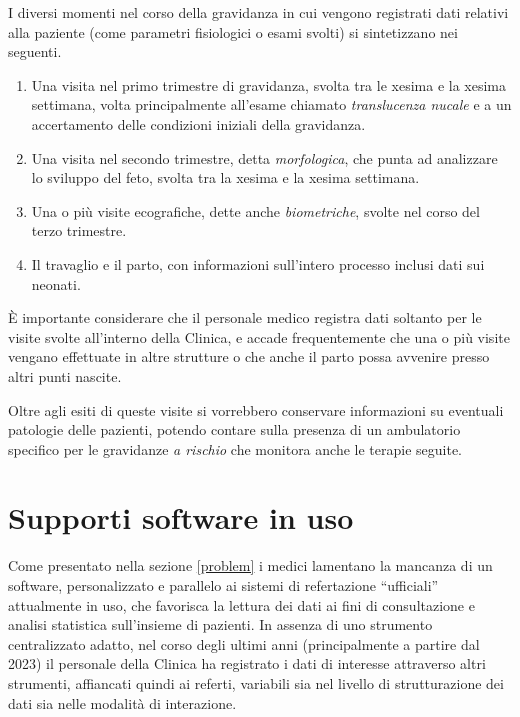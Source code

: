 I diversi momenti nel corso della gravidanza in cui vengono registrati dati relativi alla paziente (come parametri fisiologici o esami svolti) si sintetizzano nei seguenti.

\begin{enumerate}
\item Una visita nel primo trimestre di gravidanza, svolta tra le xesima e la xesima settimana, volta principalmente all'esame chiamato \emph{translucenza nucale} e a un accertamento delle condizioni iniziali della gravidanza.
\item Una visita nel secondo trimestre, detta \emph{morfologica}, che punta ad analizzare lo sviluppo del feto, svolta tra la xesima e la xesima settimana.
\item Una o più visite ecografiche, dette anche \emph{biometriche}, svolte nel corso del terzo trimestre.
\item Il travaglio e il parto, con informazioni sull'intero processo inclusi dati sui neonati.
\end{enumerate}

È importante considerare che il personale medico registra dati soltanto per le visite svolte all'interno della Clinica, e accade frequentemente che una o più visite vengano effettuate in altre strutture o che anche il parto possa avvenire presso altri punti nascite.

Oltre agli esiti di queste visite si vorrebbero conservare informazioni su eventuali patologie delle pazienti, potendo contare sulla presenza di un ambulatorio specifico per le gravidanze \emph{a rischio} che monitora anche le terapie seguite.

\section{Supporti software in uso}
\label{usednow}

Come presentato nella sezione \ref{problem} i medici lamentano la mancanza di un software, personalizzato e parallelo ai sistemi di refertazione \enquote{ufficiali} attualmente in uso, che favorisca la lettura dei dati ai fini di consultazione e analisi statistica sull'insieme di pazienti.
In assenza di uno strumento centralizzato adatto, nel corso degli ultimi anni (principalmente a partire dal 2023) il personale della Clinica ha registrato i dati di interesse attraverso altri strumenti, affiancati quindi ai referti, variabili sia nel livello di strutturazione dei dati sia nelle modalità di interazione.


